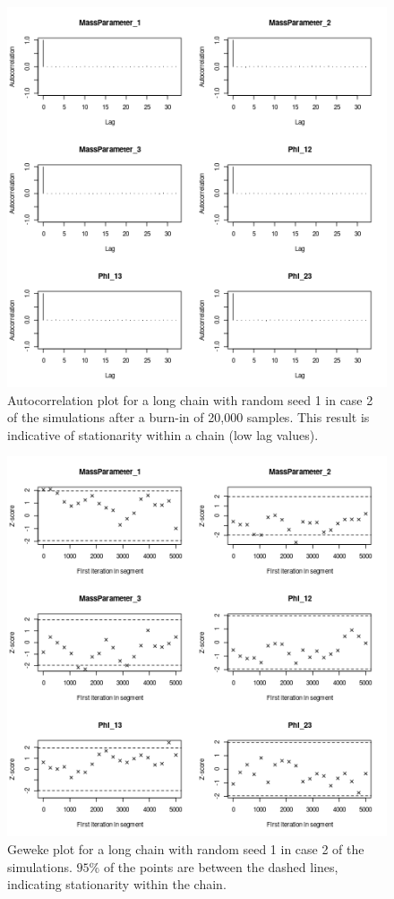 \documentclass[12pt]{article} %
\begin{document}
	
	\begin{figure}[!htb]
		\centering
		\includegraphics[scale=0.65]{Images/Gen_data/Case_2/Auto_correlation_plot_burn_20000_1.png}
		\caption{Autocorrelation plot for a long chain with random seed 1 in case 2 of the simulations after a burn-in of 20,000 samples. This result is indicative of stationarity within a chain (low lag values).}
		\label{fig:gen_data_case_2_autocorrelation_plot_burn_20000_1}
	\end{figure}
	
	
	\begin{figure}[!htb]
			\centering
			\includegraphics[scale=0.65]{Images/Gen_data/Case_2/Geweke_plot_burn_20000_1.png}
			\caption{Geweke plot for a long chain with random seed 1 in case 2 of the simulations. $95\%$ of the points are between the dashed lines, indicating stationarity within the chain.}
			\label{fig:gen_data_case_2_geweke_plot_1}
		\end{figure}
		
\end{document}
